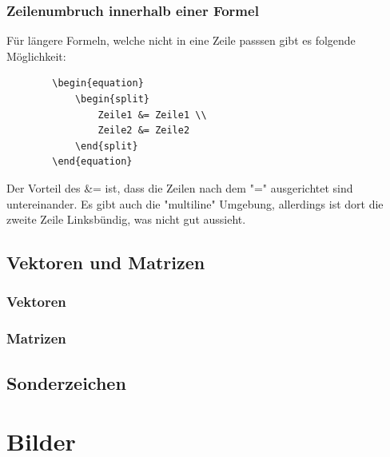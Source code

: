\documentclass[
12pt,
a4paper,
headings=small,                    %
bibliography=totoc,                %
listof=totoc,                      %
parskip=half*,                     %
]{scrartcl}                        %
\begin{document}
	\subsubsection{Zeilenumbruch innerhalb einer Formel}
	Für längere Formeln, welche nicht in eine Zeile passsen gibt es folgende Möglichkeit:
	\begin{verbatim}
		\begin{equation} 
			\begin{split} 
				Zeile1 &= Zeile1 \\ 
				Zeile2 &= Zeile2
			\end{split} 
		\end{equation} 
	\end{verbatim}
	Der Vorteil des \&= ist, dass die Zeilen nach dem "=" ausgerichtet sind untereinander. Es gibt auch die "multiline" Umgebung, allerdings ist dort die zweite Zeile Linksbündig, was nicht gut aussieht.
	
	\subsection{Vektoren und Matrizen}
	\subsubsection{Vektoren}
	\subsubsection{Matrizen}
	
	\subsection{Sonderzeichen}
	
	
	\newpage
	\section{Bilder}
\end{document}
